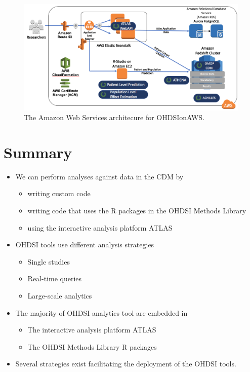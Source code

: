 \documentclass[11pt]{book}
\providecommand{\tightlist}{%
  \setlength{\itemsep}{0pt}\setlength{\parskip}{0pt}}
\theoremstyle{definition}
\theoremstyle{definition}
\theoremstyle{definition}
\theoremstyle{remark}
\let\BeginKnitrBlock\begin \let\EndKnitrBlock\end
\begin{document}
\begin{figure}

{\centering \includegraphics[width=1\linewidth]{images/OhdsiAnalyticsTools/OHDSIonAWSDiagram} 

}

\caption{The Amazon Web Services architecure for OHDSIonAWS.}\label{fig:ohdsionawsDiagram}
\end{figure}

\section{Summary}\label{summary-4}

\BeginKnitrBlock{rmdsummary}
\begin{itemize}
\tightlist
\item
  We can perform analyses against data in the CDM by

  \begin{itemize}
  \tightlist
  \item
    writing custom code
  \item
    writing code that uses the R packages in the OHDSI Methods Library
  \item
    using the interactive analysis platform ATLAS
  \end{itemize}
\item
  OHDSI tools use different analysis strategies

  \begin{itemize}
  \tightlist
  \item
    Single studies
  \item
    Real-time queries
  \item
    Large-scale analytics
  \end{itemize}
\item
  The majority of OHDSI analytics tool are embedded in

  \begin{itemize}
  \tightlist
  \item
    The interactive analysis platform ATLAS
  \item
    The OHDSI Methods Library R packages
  \end{itemize}
\item
  Several strategies exist facilitating the deployment of the OHDSI
  tools.
\end{itemize}
\EndKnitrBlock{rmdsummary}
\end{document}
